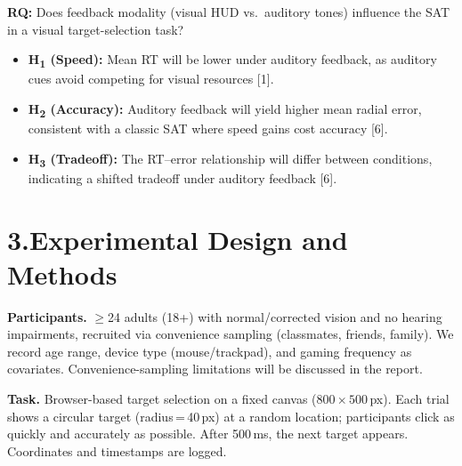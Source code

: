 \documentclass[12pt,letterpaper]{article}
\begin{document}
\textbf{RQ:} Does feedback modality (visual HUD vs.\ auditory tones) influence the SAT in a visual target-selection task?
\begin{itemize}
  \item \textbf{H\textsubscript{1} (Speed):} Mean RT will be lower under auditory feedback, as auditory cues avoid competing for visual resources [1].
  \item \textbf{H\textsubscript{2} (Accuracy):} Auditory feedback will yield higher mean radial error, consistent with a classic SAT where speed gains cost accuracy [6].
  \item \textbf{H\textsubscript{3} (Tradeoff):} The RT--error relationship will differ between conditions, indicating a shifted tradeoff under auditory feedback [6].
\end{itemize}

\section*{3.\enspace Experimental Design and Methods}

\noindent{}

\textbf{Participants.} $\ge$24 adults (18+) with normal/corrected vision and no hearing impairments, recruited via convenience sampling (classmates, friends, family). We record age range, device type (mouse/trackpad), and gaming frequency as covariates. Convenience-sampling limitations will be discussed in the report.

\textbf{Task.} Browser-based target selection on a fixed canvas ($800\!\times\!500$\,px). Each trial shows a circular target (radius\,=\,40\,px) at a random location; participants click as quickly and accurately as possible. After 500\,ms, the next target appears. Coordinates and timestamps are logged.
\end{document}
